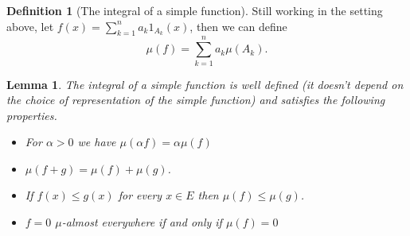 \documentclass[11pt]{article}
\newtheorem{lem}[thm]{Lemma}
\theoremstyle{definition}
\newtheorem{dfn}[thm]{Definition}
\theoremstyle{remark}
\begin{document}
\begin{dfn}[The integral of a simple function]
Still working in the setting above, let $f(x) = \sum_{k=1}^n a_k 1_{A_k}(x)$, then we can define
\[ \mu(f) = \sum_{k=1}^n a_k \mu(A_k). \]
\end{dfn}


\begin{lem}
The integral of a simple function is well defined (it doesn't depend on the choice of representation of the simple function) and satisfies the following properties.
\begin{itemize}
\item For $\alpha >0$ we have $\mu(\alpha f) = \alpha \mu(f)$
\item $\mu(f+g) = \mu(f) + \mu(g)$.
\item If $f(x) \leq g(x)$ for every $x \in E$ then $\mu(f) \leq \mu(g)$.
\item $f=0$ $\mu$-almost everywhere if and only if $\mu(f)=0$
\end{itemize}
\end{lem}
\end{document}

